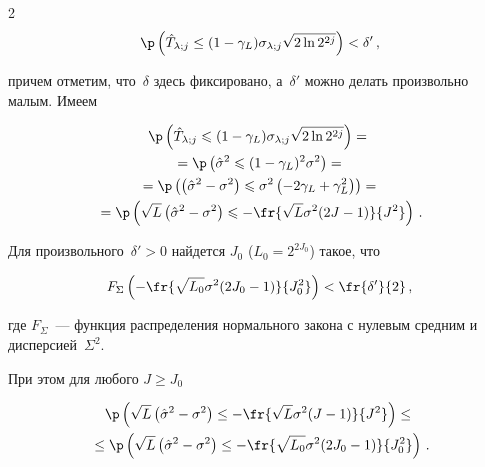 \begin{multicols}{2}
\begin{equation}


\label{eq_hatTdevProbAsympTomo}


\p\left( \hTlj \leq (1-\gamma_L)\solj\sqrt{2\ln 2^{2j}} \right)< \delta'\,,


\end{equation}


причем отметим, что~$\delta$ здесь фиксировано, а~$\delta'$ можно делать произвольно малым. Имеем


\begin{multline*}




\p\left(\hTlj\leqslant(1-\gamma_L)\solj\sqrt{2\ln 2^{2j}}\right) ={}\\


{}= \p\left(\hsig\leqslant(1-\gamma_L)^2\sigma^2\right)={}\\


{}= \p\left( \left(\hsig-\sigma^2\right) \leqslant \sigma^2\left(-2\gamma_L+\gamma_L^2\right) \right) ={}\\


{}= \p\left( \sqrt{L}\left(\hsig-\sigma^2\right) \leqslant -\fr{\sqrt{L}\sigma^2(2J-1)}{J^2} \right)\,.


\end{multline*}


Для произвольного~$\delta'>0$ найдется $J_0$ ($L_0=2^{2J_0}$) такое, что


\begin{equation*}


F_\Sigma\left( -\fr{\sqrt{L_0}\sigma^2(2J_0-1 )}{J_0^2} \right) < \fr{\delta'}{2}\,,


\end{equation*}


где $F_\Sigma$~--- функция распределения нормального закона с нулевым средним и дисперсией~$\Sigma^2$. 


При этом для любого $J\geq J_0$


\begin{multline*}


\p\left( \sqrt{L}\left(\hsig-\sigma^2\right) \leq -\fr{\sqrt{L}\sigma^2(J -1 )}{J^2} \right) \leq{} \\


{}\leq \p\left( \sqrt{L}\left(\hsig-\sigma^2\right) \leq -\fr{\sqrt{L_0}\sigma^2(2J_0 -1 )}{J_0^2}  \right)\,.


\end{multline*}



\end{multicols}
